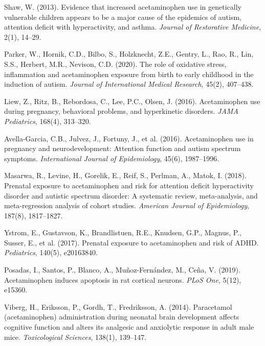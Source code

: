 \documentclass[11pt]{article}
\begin{document}
\begin{thebibliography}{99}
Shaw, W. (2013).
Evidence that increased acetaminophen use in genetically vulnerable children appears to be a major cause of the epidemics of autism, attention deficit with hyperactivity, and asthma.
\textit{Journal of Restorative Medicine}, 2(1), 14--29.

Parker, W., Hornik, C.D., Bilbo, S., Holzknecht, Z.E., Gentry, L., Rao, R., Lin, S.S., Herbert, M.R., Nevison, C.D. (2020).
The role of oxidative stress, inflammation and acetaminophen exposure from birth to early childhood in the induction of autism.
\textit{Journal of International Medical Research}, 45(2), 407--438.

Liew, Z., Ritz, B., Rebordosa, C., Lee, P.C., Olsen, J. (2016).
Acetaminophen use during pregnancy, behavioral problems, and hyperkinetic disorders.
\textit{JAMA Pediatrics}, 168(4), 313--320.

Avella-Garcia, C.B., Julvez, J., Fortuny, J., et al. (2016).
Acetaminophen use in pregnancy and neurodevelopment: Attention function and autism spectrum symptoms.
\textit{International Journal of Epidemiology}, 45(6), 1987--1996.

Masarwa, R., Levine, H., Gorelik, E., Reif, S., Perlman, A., Matok, I. (2018).
Prenatal exposure to acetaminophen and risk for attention deficit hyperactivity disorder and autistic spectrum disorder: A systematic review, meta-analysis, and meta-regression analysis of cohort studies.
\textit{American Journal of Epidemiology}, 187(8), 1817--1827.

Ystrom, E., Gustavson, K., Brandlistuen, R.E., Knudsen, G.P., Magnus, P., Susser, E., et al. (2017).
Prenatal exposure to acetaminophen and risk of ADHD.
\textit{Pediatrics}, 140(5), e20163840.

Posadas, I., Santos, P., Blanco, A., Muñoz-Fernández, M., Ceña, V. (2019).
Acetaminophen induces apoptosis in rat cortical neurons.
\textit{PLoS One}, 5(12), e15360.

Viberg, H., Eriksson, P., Gordh, T., Fredriksson, A. (2014).
Paracetamol (acetaminophen) administration during neonatal brain development affects cognitive function and alters its analgesic and anxiolytic response in adult male mice.
\textit{Toxicological Sciences}, 138(1), 139--147.


\end{thebibliography}
\end{document}
